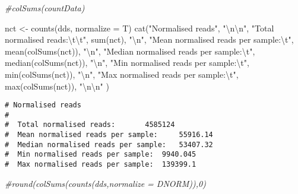 \documentclass[
]{article}
\newenvironment{Shaded}{\begin{snugshade}}{\end{snugshade}}
\newcommand{\AttributeTok}[1]{\textcolor[rgb]{0.77,0.63,0.00}{#1}}
\newcommand{\CommentTok}[1]{\textcolor[rgb]{0.56,0.35,0.01}{\textit{#1}}}
\newcommand{\FunctionTok}[1]{\textcolor[rgb]{0.00,0.00,0.00}{#1}}
\newcommand{\NormalTok}[1]{#1}
\newcommand{\OtherTok}[1]{\textcolor[rgb]{0.56,0.35,0.01}{#1}}
\newcommand{\SpecialCharTok}[1]{\textcolor[rgb]{0.00,0.00,0.00}{#1}}
\newcommand{\StringTok}[1]{\textcolor[rgb]{0.31,0.60,0.02}{#1}}
\begin{document}
\begin{Shaded}
\begin{Highlighting}[]
\CommentTok{\#colSums(countData)}

\NormalTok{nct }\OtherTok{\textless{}{-}} \FunctionTok{counts}\NormalTok{(dds, }\AttributeTok{normalize =}\NormalTok{ T)}
\FunctionTok{cat}\NormalTok{(}\StringTok{"Normalised reads"}\NormalTok{, }\StringTok{"}\SpecialCharTok{\textbackslash{}n\textbackslash{}n}\StringTok{"}\NormalTok{,}
  \StringTok{"Total normalised reads:}\SpecialCharTok{\textbackslash{}t\textbackslash{}t}\StringTok{"}\NormalTok{, }\FunctionTok{sum}\NormalTok{(nct), }\StringTok{"}\SpecialCharTok{\textbackslash{}n}\StringTok{"}\NormalTok{,}
  \StringTok{"Mean normalised reads per sample:}\SpecialCharTok{\textbackslash{}t}\StringTok{"}\NormalTok{, }\FunctionTok{mean}\NormalTok{(}\FunctionTok{colSums}\NormalTok{(nct)), }\StringTok{"}\SpecialCharTok{\textbackslash{}n}\StringTok{"}\NormalTok{,}
  \StringTok{"Median normalised reads per sample:}\SpecialCharTok{\textbackslash{}t}\StringTok{"}\NormalTok{, }\FunctionTok{median}\NormalTok{(}\FunctionTok{colSums}\NormalTok{(nct)), }\StringTok{"}\SpecialCharTok{\textbackslash{}n}\StringTok{"}\NormalTok{,}
  \StringTok{"Min normalised reads per sample:}\SpecialCharTok{\textbackslash{}t}\StringTok{"}\NormalTok{, }\FunctionTok{min}\NormalTok{(}\FunctionTok{colSums}\NormalTok{(nct)), }\StringTok{"}\SpecialCharTok{\textbackslash{}n}\StringTok{"}\NormalTok{,}
  \StringTok{"Max normalised reads per sample:}\SpecialCharTok{\textbackslash{}t}\StringTok{"}\NormalTok{, }\FunctionTok{max}\NormalTok{(}\FunctionTok{colSums}\NormalTok{(nct)), }\StringTok{"}\SpecialCharTok{\textbackslash{}n\textbackslash{}n}\StringTok{"}
\NormalTok{)}
\end{Highlighting}
\end{Shaded}

\begin{verbatim}
# Normalised reads 
# 
#  Total normalised reads:       4585124 
#  Mean normalised reads per sample:     55916.14 
#  Median normalised reads per sample:   53407.32 
#  Min normalised reads per sample:  9940.045 
#  Max normalised reads per sample:  139399.1
\end{verbatim}

\begin{Shaded}
\begin{Highlighting}[]
\CommentTok{\#round(colSums(counts(dds,normalize = DNORM)),0)}
\end{Highlighting}
\end{Shaded}
\end{document}
